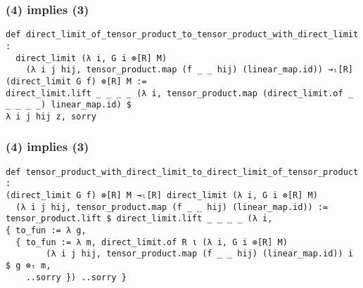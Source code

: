 \documentclass[aspectratio=169]{beamer}
\begin{document}
\begin{frame}[fragile]
\frametitle{(4) implies (3)}
\begin{minipage}{0.1\textwidth}
\end{minipage}%
\begin{minipage}{0.9\textwidth}
\begin{lstlisting}
def direct_limit_of_tensor_product_to_tensor_product_with_direct_limit : 
  direct_limit (λ i, G i ⊗[R] M) 
    (λ i j hij, tensor_product.map (f _ _ hij) (linear_map.id)) →ₗ[R] (direct_limit G f) ⊗[R] M := 
direct_limit.lift _ _ _ _ (λ i, tensor_product.map (direct_limit.of _ _ _ _ _) linear_map.id) $ 
λ i j hij z, sorry
\end{lstlisting}
\end{minipage}%

\end{frame}



\begin{frame}[fragile]
\frametitle{(4) implies (3)}
\begin{minipage}{0.1\textwidth}
\end{minipage}%
\begin{minipage}{0.9\textwidth}
\begin{lstlisting}
def tensor_product_with_direct_limit_to_direct_limit_of_tensor_product :
(direct_limit G f) ⊗[R] M →ₗ[R] direct_limit (λ i, G i ⊗[R] M) 
  (λ i j hij, tensor_product.map (f _ _ hij) (linear_map.id)) :=
tensor_product.lift $ direct_limit.lift _ _ _ _ (λ i, 
{ to_fun := λ g, 
  { to_fun := λ m, direct_limit.of R ι (λ i, G i ⊗[R] M) 
        (λ i j hij, tensor_product.map (f _ _ hij) (linear_map.id)) i $ g ⊗ₜ m,
    ..sorry }) ..sorry }
\end{lstlisting}
\end{minipage}%

\end{frame}
\end{document}
